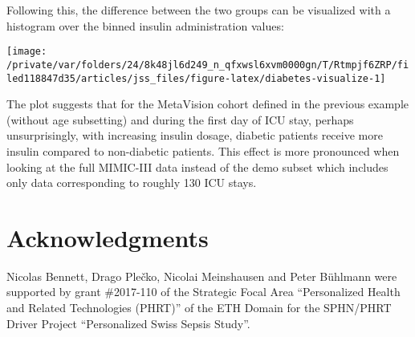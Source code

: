 \documentclass[
  notitle,
  nojss,
  noheadings]{jss}
\begin{document}
\begin{CodeChunk}
\begin{CodeInput}
R> grep_diab <- function(x) {
+   grepl("^250\\.?[0-9]{2}$", x)
+ }
R> 
R> diab  <- item(src, table = "diagnoses_icd",
+               callback = transform_fun(grep_diab),
+               class = "col_itm")
R> 
R> diab  <- concept("diab", diab, "diabetes", target = "id_tbl",
+                  class = "lgl_cncpt")
R> 
R> dat <- load_concepts(c(ins24, diab), id_type = "icustay",
+                      verbose = FALSE)
R> dat <- replace_na(dat, "[0,1)", vars = "ins24")
R> 
R> dat
\end{CodeInput}
\end{CodeChunk}

Following this, the difference between the two groups can be visualized
with a histogram over the binned insulin administration values:

\begin{CodeChunk}


\begin{center}\texttt{[image: /private/var/folders/24/8k48jl6d249\_n\_qfxwsl6xvm0000gn/T/Rtmpjf6ZRP/filed118847d35/articles/jss\_files/figure-latex/diabetes-visualize-1]} \end{center}

\end{CodeChunk}

The plot suggests that for the MetaVision cohort defined in the previous
example (without age subsetting) and during the first day of ICU stay,
perhaps unsurprisingly, with increasing insulin dosage, diabetic
patients receive more insulin compared to non-diabetic patients. This
effect is more pronounced when looking at the full MIMIC-III data
instead of the demo subset which includes only data corresponding to
roughly 130 ICU stays.

\hypertarget{acknowledgments}{%
\section{Acknowledgments}\label{acknowledgments}}

Nicolas Bennett, Drago Plečko, Nicolai Meinshausen and Peter Bühlmann
were supported by grant \#2017-110 of the Strategic Focal Area
``Personalized Health and Related Technologies (PHRT)'' of the ETH
Domain for the SPHN/PHRT Driver Project ``Personalized Swiss Sepsis
Study''.


\end{document}
